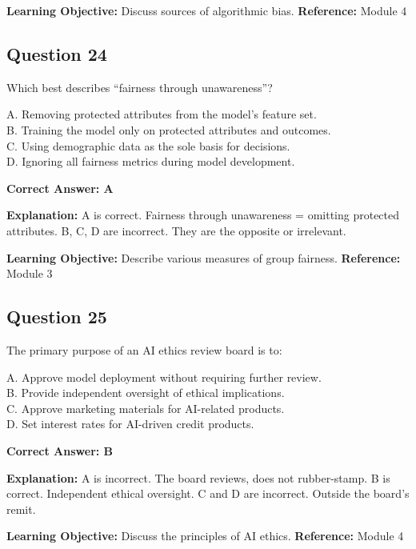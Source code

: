 \documentclass[11pt]{article}
\begin{document}
	\textbf{Learning Objective:} Discuss sources of algorithmic bias.
	\textbf{Reference:} Module 4
	
	\subsection*{Question 24}
	Which best describes ``fairness through unawareness''?
	
	A. Removing protected attributes from the model's feature set.\\
	B. Training the model only on protected attributes and outcomes.\\
	C. Using demographic data as the sole basis for decisions.\\
	D. Ignoring all fairness metrics during model development.
	
	\vspace{0.4em}
	\textbf{Correct Answer: A}
	
	\textbf{Explanation:}
	A is correct. Fairness through unawareness = omitting protected
	attributes.
	B, C, D are incorrect. They are the opposite or irrelevant.
	
	\textbf{Learning Objective:} Describe various measures of group fairness.
	\textbf{Reference:} Module 3
	
	\subsection*{Question 25}
	The primary purpose of an AI ethics review board is to:
	
	A. Approve model deployment without requiring further review.\\
	B. Provide independent oversight of ethical implications.\\
	C. Approve marketing materials for AI-related products.\\
	D. Set interest rates for AI-driven credit products.
	
	\vspace{0.4em}
	\textbf{Correct Answer: B}
	
	\textbf{Explanation:}
	A is incorrect. The board reviews, does not rubber-stamp.
	B is correct. Independent ethical oversight.
	C and D are incorrect. Outside the board's remit.
	
	\textbf{Learning Objective:} Discuss the principles of AI ethics.
	\textbf{Reference:} Module 4
	
\end{document}
